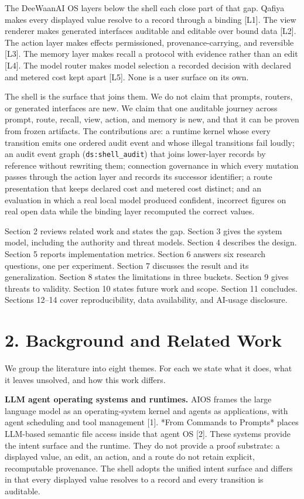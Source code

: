 \documentclass[11pt,a4paper]{article}
\begin{document}
The DeeWaanAI OS layers below the shell each close part of that gap. Qafiya makes every displayed value resolve to a record through a binding [L1]. The view renderer makes generated interfaces auditable and editable over bound data [L2]. The action layer makes effects permissioned, provenance-carrying, and reversible [L3]. The memory layer makes recall a protocol with evidence rather than an edit [L4]. The model router makes model selection a recorded decision with declared and metered cost kept apart [L5]. None is a user surface on its own.

The shell is the surface that joins them. We do not claim that prompts, routers, or generated interfaces are new. We claim that one auditable journey across prompt, route, recall, view, action, and memory is new, and that it can be proven from frozen artifacts. The contributions are: a runtime kernel whose every transition emits one ordered audit event and whose illegal transitions fail loudly; an audit event graph (\texttt{ds:shell\_audit}) that joins lower-layer records by reference without rewriting them; connection governance in which every mutation passes through the action layer and records its successor identifier; a route presentation that keeps declared cost and metered cost distinct; and an evaluation in which a real local model produced confident, incorrect figures on real open data while the binding layer recomputed the correct values.

Section 2 reviews related work and states the gap. Section 3 gives the system model, including the authority and threat models. Section 4 describes the design. Section 5 reports implementation metrics. Section 6 answers six research questions, one per experiment. Section 7 discusses the result and its generalization. Section 8 states the limitations in three buckets. Section 9 gives threats to validity. Section 10 states future work and scope. Section 11 concludes. Sections 12--14 cover reproducibility, data availability, and AI-usage disclosure.

\section*{2. Background and Related Work}
We group the literature into eight themes. For each we state what it does, what it leaves unsolved, and how this work differs.

\textbf{LLM agent operating systems and runtimes.} AIOS frames the large language model as an operating-system kernel and agents as applications, with agent scheduling and tool management [1]. *From Commands to Prompts* places LLM-based semantic file access inside that agent OS [2]. These systems provide the intent surface and the runtime. They do not provide a proof substrate: a displayed value, an edit, an action, and a route do not retain explicit, recomputable provenance. The shell adopts the unified intent surface and differs in that every displayed value resolves to a record and every transition is auditable.
\end{document}
